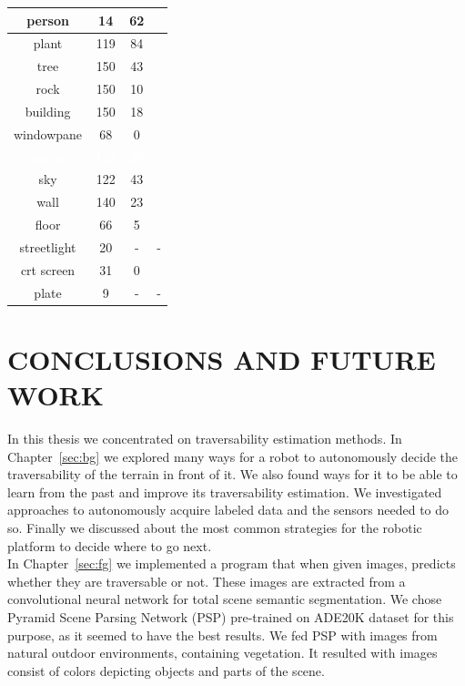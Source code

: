 \documentclass[12pt,a4paper,table,dvipsnames,tikz]{report}
\newcommand{\acronym}{\MakeUppercase}
\newcommand{\white}[1]{\textbf{\textcolor{white}{#1}}} %
\begin{document}
\begin{table}[h!]
\begin{subtable}[h!]{\textwidth}
\begin{tabular}{|c|c|c|c|}
				\hline\hline
				person & 14 & 62 &\\
				\hline
				plant & 119 & 84 &\\
				\hline
				\rowcolor{tree}
				tree & 150 & 43 & \checkmark\\
				\hline
				rock & 150 & 10 & \checkmark\\
				\hline
				building & 150 & 18 & \checkmark\\
				\hline
				windowpane & 68 & 0 & \checkmark\\
				\hline
				\rowcolor{earth}
				\white{earth} & \white{127} & \white{43} & \white{\checkmark}\\
				\hline
				\rowcolor{sky}
				sky & 122 & 43 & \checkmark\\
				\hline
				wall & 140 & 23 & \checkmark\\
				\hline
				floor & 66 & 5 & \checkmark\\
				\hline
				streetlight & 20 & - & -\\
				\hline
				crt screen & 31 & 0 & \checkmark\\
				\hline
				plate & 9 & - & -\\
				\hline
			\end{tabular}
			\label{table:obst.f5}
		\end{subtable}
	\end{table}
	
	
	
	\chapter{CONCLUSIONS AND FUTURE WORK}
	\label{sec:concl}
	
	In this thesis we concentrated on traversability estimation methods. In 
	Chapter~\ref{sec:bg} we explored many ways for a robot to autonomously decide 
	the traversability of the terrain in front of it. We also found ways for it to 
	be able to learn from the past and improve its traversability estimation. We investigated 
	approaches to autonomously acquire labeled data and the sensors needed to do so. 
	Finally we discussed about the most common strategies for the robotic platform 
	to decide where to go next.
	\\
	
	In Chapter~\ref{sec:fg} we implemented a program that when given images, predicts 
	whether they are traversable or not. These images are extracted from a convolutional 
	neural network for total scene semantic segmentation. We chose Pyramid Scene 
	Parsing Network (\acronym{psp}) pre-trained on \acronym{ade20k} dataset for this 
	purpose, as it seemed to have the best 
	results. We fed \acronym{psp} with images from natural outdoor environments, 
	containing vegetation. It resulted with images consist of colors depicting objects 
	and parts of the scene.
	\\
	
\end{document}
